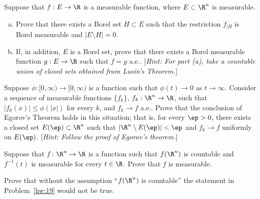 

\begin{hwsol}
Suppose that $f: E \to \R$ is a measurable function, where $E \subset \R^n$ is measurable. 
\begin{enumerate}[(a)]
\item Prove that there exists a Borel set $H \subset E$ such that the restriction $f_{|H}$ is Borel measurable and $|E \setminus H|=0$. 
\item If, in addition, $E$ is a Borel set, prove that there exists a Borel measurable function $g: E \to \R$ such that $f=g$ a.e.. [\emph{Hint: For part (a), take a countable union of closed sets obtained from Lusin's Theorem.}]
\end{enumerate}
\end{hwsol}


\begin{hwsol}
Suppose $\phi\colon [0, \infty )\to [0, \infty)$ is a function such that $\phi(t) \to 0$ as $t \to \infty$. Consider a sequence of measurable functions $\{f_k\}$, $f_k: \R^n \to \R$, such that $|f_k(x)| \leq \phi(|x|)$ for every $k$, and $f_k \to f$ a.e.. Prove that the conclusion of Egorov's Theorem holds in this situation; that is, for every $\ep>0$, there exists a closed set $E(\ep) \subset \R^n$ such that $|\R^n \setminus E(\ep)| < \ep$ and $f_k \to f$ uniformly on $E(\ep)$. [\emph{Hint: Follow the proof of Egorov's theorem.}]
\end{hwsol}


\begin{hwsol}
Suppose that $f\colon \R^n \to \R$ is a function such that $f(\R^n)$ is countable and $f^{-1}(t)$ is measurable for every $t \in \R$. Prove that $f$ is measurable. 
\end{hwsol}


\begin{hwsol}
Prove that without the assumption ``$f(\R^n)$ is countable'' the statement in Problem~\ref{hw:19} would not be true.   
\end{hwsol}































